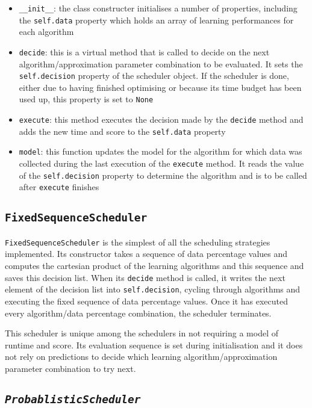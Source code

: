 \documentclass[a4paper,12pt,twoside,openright]{report}
\begin{document}
\begin{itemize}
\item \texttt{\_\_init\_\_}: the class constructer initialises a number of properties, including the \texttt{self.data} property which holds an array of learning performances for each algorithm
\item \texttt{decide}: this is a virtual method that is called to decide on the next algorithm/approximation parameter combination to be evaluated. It sets the \texttt{self.decision} property of the scheduler object. If the scheduler is done, either due to having finished optimising or because its time budget has been used up, this property is set to \texttt{None}
\item \texttt{execute}: this method executes the decision made by the \texttt{decide} method and adds the new time and score to the \texttt{self.data} property
\item \texttt{model}: this function updates the model for the algorithm for which data was collected during the last execution of the \texttt{execute} method. It reads the value of the \texttt{self.decision} property to determine the algorithm and is to be called after \texttt{execute} finishes
\end{itemize}


\subsection{\texttt{FixedSequenceScheduler}}
\texttt{FixedSequenceScheduler} is the simplest of all the scheduling strategies implemented. Its constructor takes a sequence of data percentage values and computes the cartesian product of the learning algorithms and this sequence and saves this decision list. When its \texttt{decide} method is called, it writes the next element of the decision list into \texttt{self.decision}, cycling through algorithms and executing the fixed sequence of data percentage values. Once it has executed every algorithm/data percentage combination, the scheduler terminates.

This scheduler is unique among the schedulers in not requiring a model of runtime and score. Its evaluation sequence is set during initialisation and it does not rely on predictions to decide which learning algorithm/approximation parameter combination to try next.



\subsection{\texttt{\textit{ProbablisticScheduler}}}
\end{document}
